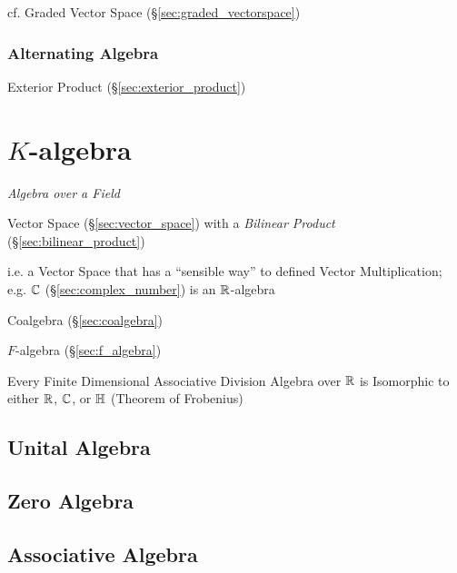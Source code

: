 {{cf. Graded Vector Space (\S\ref{sec:graded_vectorspace})



\subsubsection{Alternating Algebra}\label{sec:alternating_algebra}

Exterior Product (\S\ref{sec:exterior_product})



\section{$K$-algebra}\label{sec:k_algebra}

\emph{Algebra over a Field}

Vector Space (\S\ref{sec:vector_space}) with a \emph{Bilinear Product}
(\S\ref{sec:bilinear_product})

i.e. a Vector Space that has a ``sensible way'' to defined Vector
Multiplication; e.g. $\mathbb{C}$ (\S\ref{sec:complex_number}) is an
$\mathbb{R}$-algebra

Coalgebra (\S\ref{sec:coalgebra})

$F$-algebra (\S\ref{sec:f_algebra})

Every Finite Dimensional Associative Division Algebra over $\mathbb{R}$ is
Isomorphic to either $\mathbb{R}$, $\mathbb{C}$, or $\mathbb{H}$ (Theorem of
Frobenius) %



\subsection{Unital Algebra}\label{sec:unital_algebra}

\subsection{Zero Algebra}\label{sec:zero_algebra}

\subsection{Associative Algebra}\label{sec:associative_algebra}

}}
